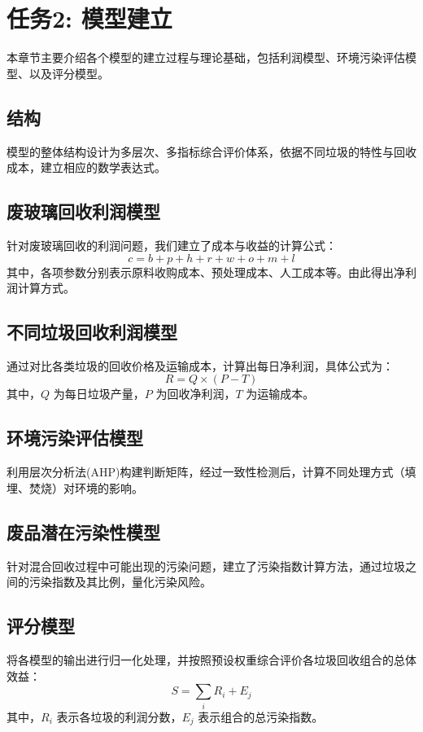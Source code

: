 \section{任务2: 模型建立}
本章节主要介绍各个模型的建立过程与理论基础，包括利润模型、环境污染评估模型、以及评分模型。

\subsection{结构}
模型的整体结构设计为多层次、多指标综合评价体系，依据不同垃圾的特性与回收成本，建立相应的数学表达式。

\subsection{废玻璃回收利润模型}
针对废玻璃回收的利润问题，我们建立了成本与收益的计算公式：
\[
c = b + p + h + r + w + o + m + l
\]
其中，各项参数分别表示原料收购成本、预处理成本、人工成本等。由此得出净利润计算方式。

\subsection{不同垃圾回收利润模型}
通过对比各类垃圾的回收价格及运输成本，计算出每日净利润，具体公式为：
\[
R = Q \times (P - T)
\]
其中，\(Q\) 为每日垃圾产量，\(P\) 为回收净利润，\(T\) 为运输成本。

\subsection{环境污染评估模型}
利用层次分析法(AHP)构建判断矩阵，经过一致性检测后，计算不同处理方式（填埋、焚烧）对环境的影响。

\subsection{废品潜在污染性模型}
针对混合回收过程中可能出现的污染问题，建立了污染指数计算方法，通过垃圾之间的污染指数及其比例，量化污染风险。

\subsection{评分模型}
将各模型的输出进行归一化处理，并按照预设权重综合评价各垃圾回收组合的总体效益：
\[
S = \sum_{i} R_i + E_j
\]
其中，\(R_i\) 表示各垃圾的利润分数，\(E_j\) 表示组合的总污染指数。
